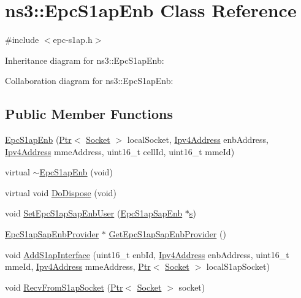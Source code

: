 \hypertarget{classns3_1_1EpcS1apEnb}{}\section{ns3\+:\+:Epc\+S1ap\+Enb Class Reference}
\label{classns3_1_1EpcS1apEnb}


{\ttfamily \#include $<$epc-\/s1ap.\+h$>$}



Inheritance diagram for ns3\+:\+:Epc\+S1ap\+Enb\+:


Collaboration diagram for ns3\+:\+:Epc\+S1ap\+Enb\+:
\subsection*{Public Member Functions}
\begin{DoxyCompactItemize}
\item 
\hyperlink{classns3_1_1EpcS1apEnb_aaa786c9859799772cfbc97dac04376dd}{Epc\+S1ap\+Enb} (\hyperlink{classns3_1_1Ptr}{Ptr}$<$ \hyperlink{classns3_1_1Socket}{Socket} $>$ local\+Socket, \hyperlink{classns3_1_1Ipv4Address}{Ipv4\+Address} enb\+Address, \hyperlink{classns3_1_1Ipv4Address}{Ipv4\+Address} mme\+Address, uint16\+\_\+t cell\+Id, uint16\+\_\+t mme\+Id)
\item 
virtual \hyperlink{classns3_1_1EpcS1apEnb_a3749964b15359794357b50ed8f9cd74a}{$\sim$\+Epc\+S1ap\+Enb} (void)
\item 
virtual void \hyperlink{classns3_1_1EpcS1apEnb_a8b0690cb83c76c8cd56cfdb5bf77dd3a}{Do\+Dispose} (void)
\item 
void \hyperlink{classns3_1_1EpcS1apEnb_ac32d9cdb47e641d281d1dbc4393fd709}{Set\+Epc\+S1ap\+Sap\+Enb\+User} (\hyperlink{classns3_1_1EpcS1apSapEnb}{Epc\+S1ap\+Sap\+Enb} $\ast$\hyperlink{generate__test__data__lte__sinr_8m_ad83eeb3a142285d1243a08c6b7026df8}{s})
\item 
\hyperlink{classns3_1_1EpcS1apSapEnbProvider}{Epc\+S1ap\+Sap\+Enb\+Provider} $\ast$ \hyperlink{classns3_1_1EpcS1apEnb_acd8f5c05b514c122c95af009d55a1893}{Get\+Epc\+S1ap\+Sap\+Enb\+Provider} ()
\item 
void \hyperlink{classns3_1_1EpcS1apEnb_ac04aee5e05a6a762073de25c21dff263}{Add\+S1ap\+Interface} (uint16\+\_\+t enb\+Id, \hyperlink{classns3_1_1Ipv4Address}{Ipv4\+Address} enb\+Address, uint16\+\_\+t mme\+Id, \hyperlink{classns3_1_1Ipv4Address}{Ipv4\+Address} mme\+Address, \hyperlink{classns3_1_1Ptr}{Ptr}$<$ \hyperlink{classns3_1_1Socket}{Socket} $>$ local\+S1ap\+Socket)
\item 
void \hyperlink{classns3_1_1EpcS1apEnb_a75238a3f98ccb5cf21f28c0cda8d68e6}{Recv\+From\+S1ap\+Socket} (\hyperlink{classns3_1_1Ptr}{Ptr}$<$ \hyperlink{classns3_1_1Socket}{Socket} $>$ socket)
\end{DoxyCompactItemize}
